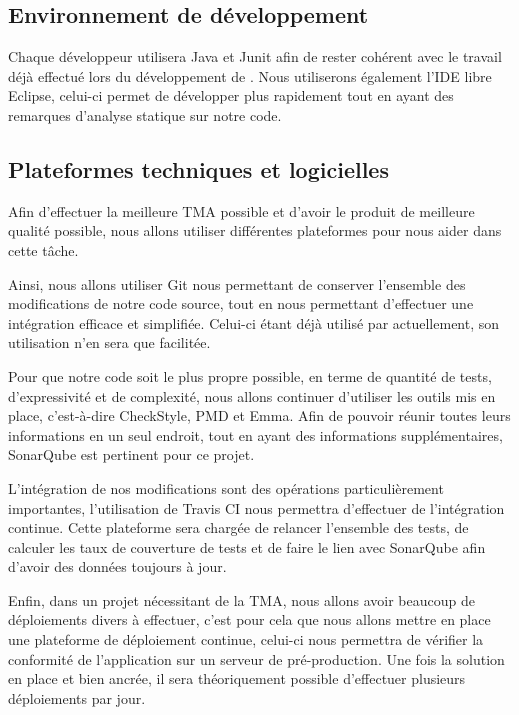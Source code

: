 	\subsection{Environnement de développement}
	Chaque développeur utilisera Java et Junit afin de rester cohérent avec le travail déjà effectué lors du développement de \correlyce{}. Nous utiliserons également l’IDE libre Eclipse, celui-ci permet de développer plus rapidement tout en ayant des remarques d’analyse statique sur notre code.
	
	\subsection{Plateformes techniques et logicielles}
	Afin d’effectuer la meilleure TMA possible et d’avoir le produit de meilleure qualité possible, nous allons utiliser différentes plateformes pour nous aider dans cette tâche. 
	
	Ainsi, nous allons utiliser Git nous permettant de conserver l’ensemble des modifications de notre code source, tout en nous permettant d’effectuer une intégration efficace et simplifiée.
	Celui-ci étant déjà utilisé par \correlyce{} actuellement, son utilisation n’en sera que facilitée.
	
	Pour que notre code soit le plus propre possible, en terme de quantité de tests, d’expressivité et de complexité, nous allons continuer d’utiliser les outils mis en place, c’est-à-dire CheckStyle, PMD et Emma. Afin de pouvoir réunir toutes leurs informations en un seul endroit, tout en ayant des informations supplémentaires, SonarQube est pertinent pour ce projet.
	
	L’intégration de nos modifications sont des opérations particulièrement importantes, l’utilisation de Travis CI nous permettra d’effectuer de l’intégration continue. Cette plateforme sera chargée de relancer l’ensemble des tests, de calculer les taux de couverture de tests et de faire le lien avec SonarQube afin d’avoir des données toujours à jour.
	
	Enfin, dans un projet nécessitant de la TMA, nous allons avoir beaucoup de déploiements divers à effectuer, c’est pour cela que nous allons mettre en place une plateforme de déploiement continue, celui-ci nous permettra de vérifier la conformité de l’application sur un serveur de pré-production.
	Une fois la solution en place et bien ancrée, il sera théoriquement possible d’effectuer plusieurs déploiements par jour.
	
	
